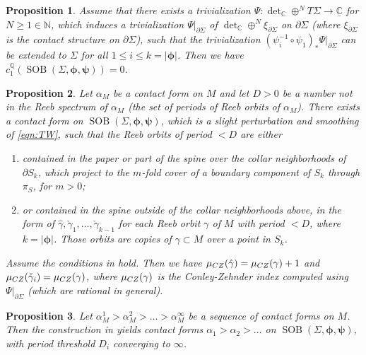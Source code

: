\documentclass[10pt,a4paper]{amsart}
\newtheorem{proposition}{Proposition}
\def\C{{\mathbb C}}
\def\CZ{\rm CZ}
\def\N{{\mathbb N}}
\def\Q{{\mathbb Q}}
\DeclareMathOperator{\SOB}{SOB}
\begin{document}
\begin{proposition}\label{prop:c1}
    Assume that there exists a trivialization $\Psi: \det_{\C}\oplus^N T\Sigma\to \underline{\C}$ for $N\ge 1 \in \N$, which induces a trivialization $\Psi|_{\partial \Sigma}$ of $\det_{\C}\oplus^N \xi_{\partial \Sigma}$ on $\partial \Sigma$ (where $\xi_{\partial \Sigma}$ is the contact structure on $\partial \Sigma$), such that the trivialization $(\psi_i^{-1}\circ \psi_1)_*\Psi|_{\partial \Sigma}$ can be extended to $\Sigma$ for all $1\le i \le k=|\bm{\phi}|$. Then we have $c_1^{\Q}(\SOB(\Sigma,\bm{\phi},\bm{\psi}))=0$.
\end{proposition}

\begin{proposition}\label{prop:CZ}
    Let $\alpha_M$ be a contact form on $M$ and let $D>0$ be a number not in the Reeb spectrum of $\alpha_M$ (the set of periods of Reeb orbits of $\alpha_M$). There exists a contact form on $\SOB(\Sigma,\bm{\phi},\bm{\psi})$, which is a slight perturbation and smoothing of \eqref{eqn:TW}, such that the Reeb orbits of period $<D$ are either
    \begin{enumerate}
        \item contained in the paper or part of the spine over the collar neighborhoods of $\partial S_k$, which project to the $m$-fold cover of a boundary component of $S_k$ through $\pi_S$, for $m>0$;
        \item or contained in the spine outside of the collar neighborhoods above, in the form of $\hat{\gamma},\check{\gamma}_1,\ldots,\check{\gamma}_{k-1}$ for each Reeb orbit $\gamma$ of $M$ with period $<D$, where $k=|\bm{\phi}|$. Those orbits are copies of $\gamma \subset M$ over a point in $S_k$.
    \end{enumerate}
    Assume the conditions in  hold. Then we have $\mu_{\CZ}(\hat{\gamma})=\mu_{\CZ}(\gamma)+1$ and $\mu_{\CZ}(\check{\gamma}_i)=\mu_{\CZ}(\gamma)$, where $\mu_{\CZ}(\gamma)$ is the Conley-Zehnder index computed using $\Psi|_{\partial \Sigma}$ (which are rational in general).
\end{proposition}

\begin{proposition}\label{prop:filtration}
    Let $\alpha^1_M>\alpha^2_M>\ldots >\alpha^\infty_M$ be a sequence of contact forms on $M$. Then the construction in  yields contact forms $\alpha_1>\alpha_2>\ldots$ on $\SOB(\Sigma,\bm{\phi},\bm{\psi})$, with period threshold $D_i$ converging to $\infty$.
\end{proposition}
\end{document}
